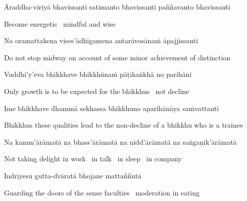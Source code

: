\begin{pali-hang}
  Āraddha-vīriyā bhavissanti satimanto bhavissanti paññavanto bhavissanti
\end{pali-hang}

\begin{english}
  Become energetic \breathmark\ mindful and wise
\end{english}

\ifbfive\clearpage\fi
\ifafive\clearpage\fi

\begin{pali-hang}
Na oramattakena vises'ādhigamena antarāvosānaṁ āpajjissanti
\end{pali-hang}

\begin{english-hang}
  Do not stop midway on account of some minor achievement of distinction
\end{english-hang}

\begin{pali-hang}
Vuddhi'y'eva bhikkhave bhikkhūnaṁ pāṭikaṅkhā no parihāni
\end{pali-hang}

\begin{english-hang}
  Only growth is to be expected for the bhikkhus \breathmark\ not decline
\end{english-hang}

\suttaRef{[AN 7.23-27]}

\begin{pali-hang}
  Ime bhikkhave dhammā sekhassa bhikkhuno aparihānāya saṁvattanti
\end{pali-hang}

\begin{english-hang}
  Bhikkhus these qualities lead to the non-decline of a bhikkhu who is a trainee
\end{english-hang}

\begin{pali-hang}
  Na kamm'ārāmatā na bhass'ārāmatā na nidd'ārāmatā na saṅgaṇik'ārāmatā
\end{pali-hang}

\begin{english-hang}
  Not taking delight in work \breathmark\ in talk \breathmark\ in sleep \breathmark\ in company
\end{english-hang}

Indriyesu gutta-dvāratā bhojane mattaññutā

\begin{english-hang}
  Guarding the doors of the sense faculties \breathmark\ moderation in eating
\end{english-hang}

